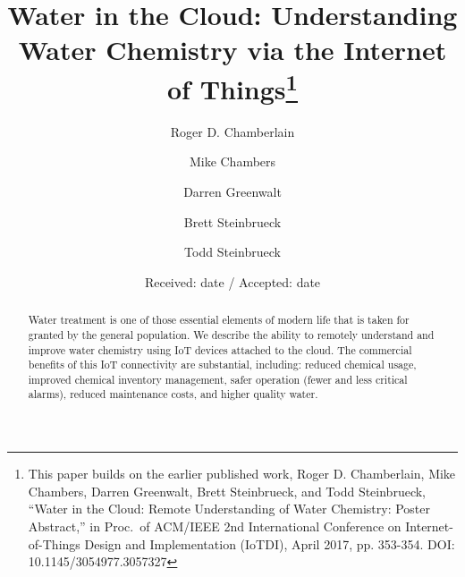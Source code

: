 \documentclass[smallextended]{svjour3}       %
\begin{document}
\title{Water in the Cloud: Understanding Water Chemistry via the
Internet of Things\thanks{This paper builds on the earlier published work,
Roger D. Chamberlain, Mike Chambers, Darren Greenwalt, Brett Steinbrueck,
and Todd Steinbrueck, ``Water in the Cloud: Remote Understanding of Water
Chemistry: Poster Abstract,'' in Proc.~of ACM/IEEE 2nd International
Conference on Internet-of-Things Design and Implementation (IoTDI),
April 2017, pp. 353-354. DOI: 10.1145/3054977.3057327}
}


\author{Roger D. Chamberlain
\and
 Mike Chambers
\and
 Darren Greenwalt
\and
 Brett Steinbrueck
\and
 Todd Steinbrueck
}



\date{Received: date / Accepted: date}


\maketitle

\begin{abstract}
Water treatment is one of those essential elements of modern life
that is taken for granted by the general population.
We describe the ability to remotely understand and
improve water chemistry using IoT devices attached to the cloud.
The commercial benefits of this IoT connectivity are substantial,
including: reduced chemical usage, improved chemical inventory 
management, safer operation (fewer and less critical alarms),
reduced maintenance costs, and higher quality water.

\end{abstract}
\end{document}
